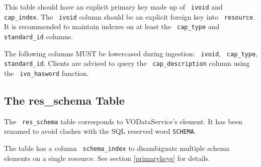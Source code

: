 \documentclass[11pt,a4paper]{ivoa}
\newcommand{\rtent}[1]{\texttt{\color{rtcolor} #1}}
\begin{document}

 

This table should have an explicit primary key made up of
\rtent{ivoid} and \rtent{cap\_index}.
The \rtent{ivoid} column should be
an explicit foreign key into \rtent{resource}.
It is recommended to maintain indexes on at least the 
\rtent{cap\_type} and \rtent{standard\_id} columns.

The following columns MUST be lowercased during ingestion:
\rtent{ivoid}, \rtent{cap\_type}, \rtent{standard\_id}.
Clients are advised to query the \rtent{cap\_description} column
using the \rtent{ivo\_hasword} function.



\subsection{The res\_schema Table}

\label{table_res_schema}

The \rtent{res\_schema} table corresponds to VODataService's
 element.  It has been renamed to avoid clashes with
the SQL reserved word \texttt{SCHEMA}.

The table has a column \rtent{schema\_index} to disambiguate
multiple schema elements on a single resource.  See section \ref{primarykeys} for details.


\end{document}
